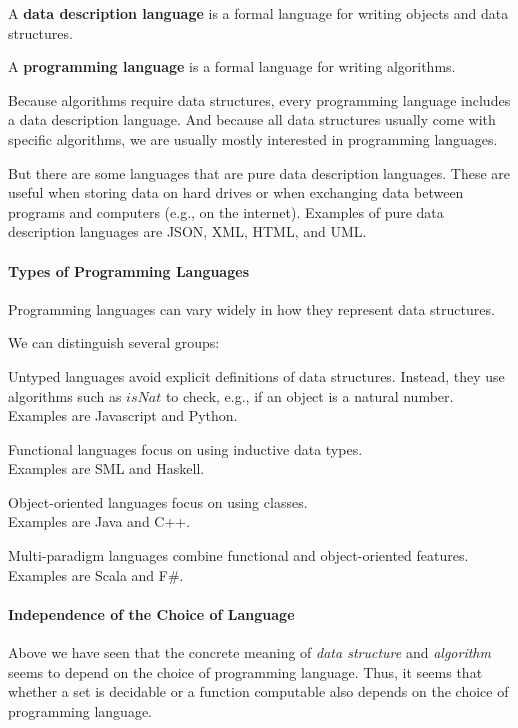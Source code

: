 \begin{definition}[Languages]
A \textbf{data description language} is a formal language for writing objects and data structures.

A \textbf{programming language} is a formal language for writing algorithms.
\end{definition}

Because algorithms require data structures, every programming language includes a data description language.
And because all data structures usually come with specific algorithms, we are usually mostly interested in programming languages.

But there are some languages that are pure data description languages.
These are useful when storing data on hard drives or when exchanging data between programs and computers (e.g., on the internet).
Examples of pure data description languages are JSON, XML, HTML, and UML.

\paragraph{Types of Programming Languages}
Programming languages can vary widely in how they represent data structures.

We can distinguish several groups:
\begin{compactitem}
\item Untyped languages avoid explicit definitions of data structures.
Instead, they use algorithms such as $\mathit{isNat}$ to check, e.g., if an object is a natural number.\\
Examples are Javascript and Python.
\item Functional languages focus on using inductive data types.\\
Examples are SML and Haskell.
\item Object-oriented languages focus on using classes.\\
Examples are Java and C++.
\item Multi-paradigm languages combine functional and object-oriented features.\\
Examples are Scala and F\#.
\end{compactitem}


\paragraph{Independence of the Choice of Language}
Above we have seen that the concrete meaning of \emph{data structure} and \emph{algorithm} seems to depend on the choice of programming language.
Thus, it seems that whether a set is decidable or a function computable also depends on the choice of programming language.

